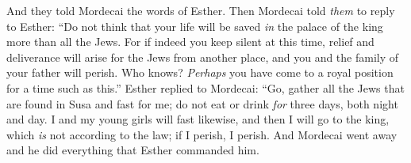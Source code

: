 \begin{biblechapter}
\verse And they told Mordecai the words of Esther.
\verse Then Mordecai told \textit{them} to reply to Esther: “Do not think that your life will be saved \textit{in} the palace of the king more than all the Jews.
\verse For if indeed you keep silent at this time, relief and deliverance will arise for the Jews from another place, and you and the family of your father will perish. Who knows? \textit{Perhaps} you have come to a royal position for a time such as this.”
\verse Esther replied to Mordecai:
\verse “Go, gather all the Jews that are found in Susa and fast for me; do not eat or drink \textit{for} three days, both night and day. I and my young girls will fast likewise, and then I will go to the king, which \textit{is} not according to the law; if I perish, I perish.
\verse And Mordecai went away and he did everything that Esther commanded him.
\end{biblechapter}

